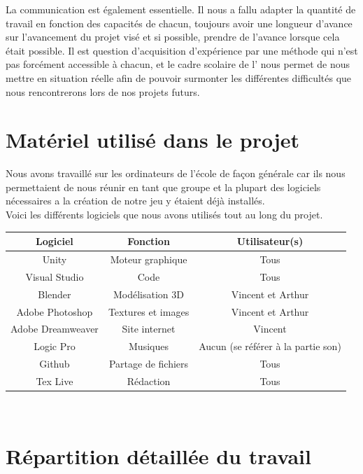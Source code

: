 \documentclass[12pt, titlepage]{article}
\begin{document}
\begin{spacing}{1.5}
La communication est également essentielle. Il nous a fallu adapter la quantité de travail en fonction des capacités de chacun, toujours avoir une longueur d'avance sur l'avancement du projet visé et si possible, prendre de l'avance lorsque cela était possible. Il est question d'acquisition d'expérience par une méthode qui n'est pas forcément accessible à chacun, et le cadre scolaire de l' nous permet de nous mettre en situation réelle afin de pouvoir surmonter les différentes difficultés que nous rencontrerons lors de nos projets futurs.\\

\newpage
\section{Matériel utilisé dans le projet}

Nous avons travaillé sur les ordinateurs de l'école de façon générale car ils nous permettaient de nous réunir en tant que groupe et la plupart des logiciels nécessaires a la création de notre jeu y étaient déjà installés.\\

Voici les différents logiciels que nous avons utilisés tout au long du projet.\\

\begin{center}
\begin{tabular}{|c|c|c|}
\hline
Logiciel & Fonction & Utilisateur(s)\\
\hline
Unity & Moteur graphique & Tous\\
\hline
Visual Studio & Code & Tous\\
\hline
Blender & Modélisation 3D & Vincent et Arthur\\
\hline
Adobe Photoshop & Textures et images & Vincent et Arthur\\
\hline
Adobe Dreamweaver & Site internet & Vincent\\
\hline
Logic Pro & Musiques & Aucun (se référer à  la partie son)\\
\hline
Github & Partage de fichiers & Tous\\
\hline
Tex Live & Rédaction & Tous\\
\hline
\end{tabular}\\

\end{center}

\newpage
\section{Répartition détaillée du travail}


\end{spacing}
\end{document}

